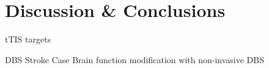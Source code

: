\pagebreak
\chapter{Discussion \& Conclusions}
\label{sec:discussion}


\cite{Esmaeilpour2019} tTIS targets

\cite{Cagnan2019} DBS
\cite{Bao2020} Stroke Case
\cite{Polania2018} Brain function modification with non-invasive DBS


\cite{Dmochowski2017}
\cite{Hsu2019}
